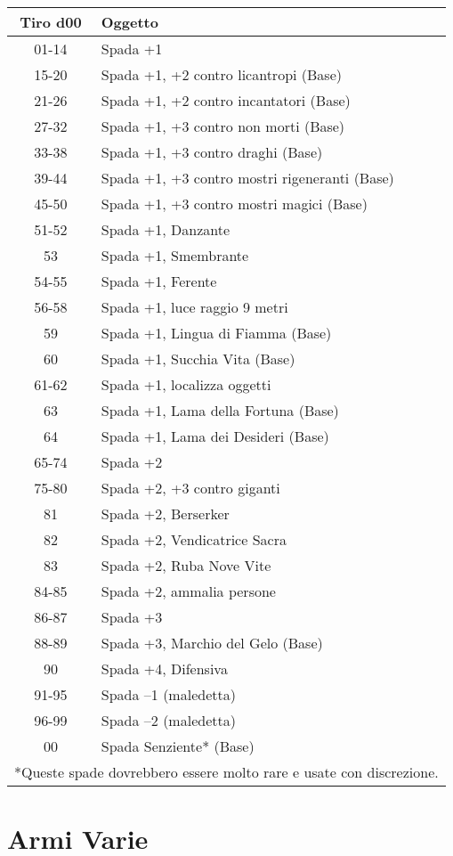 \documentclass{article}
\begin{document}
\begin{multicols}{2}
\begin{tabular}{|c|l|}
\hline
\textbf{Tiro d00} & \textbf{Oggetto} \\
\hline
01-14 & Spada +1 \\
15-20 & Spada +1, +2 contro licantropi (Base) \\
21-26 & Spada +1, +2 contro incantatori (Base) \\
27-32 & Spada +1, +3 contro non morti (Base) \\
33-38 & Spada +1, +3 contro draghi (Base) \\
39-44 & Spada +1, +3 contro mostri rigeneranti (Base) \\
45-50 & Spada +1, +3 contro mostri magici (Base) \\
51-52 & Spada +1, Danzante \\
53 & Spada +1, Smembrante \\
54-55 & Spada +1, Ferente \\
56-58 & Spada +1, luce raggio 9 metri \\
59 & Spada +1, Lingua di Fiamma (Base) \\
60 & Spada +1, Succhia Vita (Base) \\
61-62 & Spada +1, localizza oggetti \\
63 & Spada +1, Lama della Fortuna (Base) \\
64 & Spada +1, Lama dei Desideri (Base) \\
65-74 & Spada +2 \\
75-80 & Spada +2, +3 contro giganti \\
81 & Spada +2, Berserker \\
82 & Spada +2, Vendicatrice Sacra \\
83 & Spada +2, Ruba Nove Vite \\
84-85 & Spada +2, ammalia persone \\
86-87 & Spada +3 \\
88-89 & Spada +3, Marchio del Gelo (Base) \\
90 & Spada +4, Difensiva \\
91-95 & Spada –1 (maledetta) \\
96-99 & Spada –2 (maledetta) \\
00 & Spada Senziente* (Base) \\
\hline
\multicolumn{2}{l}{*Queste spade dovrebbero essere molto rare e usate con discrezione.} \\

\end{tabular}


\section{Armi Varie}


\end{multicols}
\end{document}
